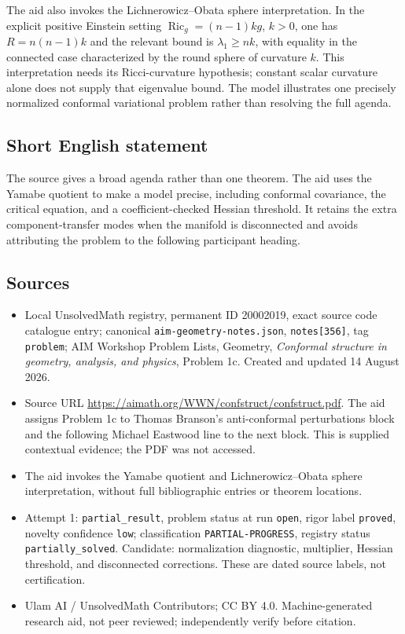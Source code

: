 \documentclass[11pt]{article}
\begin{document}
The aid also invokes the Lichnerowicz--Obata sphere interpretation. In the explicit positive Einstein setting \(\operatorname{Ric}_g=(n-1)kg\), \(k>0\), one has \(R=n(n-1)k\) and the relevant bound is \(\lambda_1\ge nk\), with equality in the connected case characterized by the round sphere of curvature \(k\). This interpretation needs its Ricci-curvature hypothesis; constant scalar curvature alone does not supply that eigenvalue bound. The model illustrates one precisely normalized conformal variational problem rather than resolving the full agenda.
\subsection{Short English statement}
The source gives a broad agenda rather than one theorem. The aid uses the Yamabe quotient to make a model precise, including conformal covariance, the critical equation, and a coefficient-checked Hessian threshold. It retains the extra component-transfer modes when the manifold is disconnected and avoids attributing the problem to the following participant heading.
\subsection{Sources}
\begin{itemize}
\item Local UnsolvedMath registry, permanent ID 20002019, exact source code catalogue entry; canonical \texttt{aim-geometry-notes.json}, \texttt{notes[356]}, tag \texttt{problem}; AIM Workshop Problem Lists, Geometry, \emph{Conformal structure in geometry, analysis, and physics}, Problem 1c. Created and updated 14 August 2026.
\item Source URL \url{https://aimath.org/WWN/confstruct/confstruct.pdf}. The aid assigns Problem 1c to Thomas Branson's anti-conformal perturbations block and the following Michael Eastwood line to the next block. This is supplied contextual evidence; the PDF was not accessed.
\item The aid invokes the Yamabe quotient and Lichnerowicz--Obata sphere interpretation, without full bibliographic entries or theorem locations.
\item Attempt 1: \texttt{partial\_result}, problem status at run \texttt{open}, rigor label \texttt{proved}, novelty confidence \texttt{low}; classification \texttt{PARTIAL-PROGRESS}, registry status \texttt{partially\_solved}. Candidate: normalization diagnostic, multiplier, Hessian threshold, and disconnected corrections. These are dated source labels, not certification.
\item Ulam AI / UnsolvedMath Contributors; CC BY 4.0. Machine-generated research aid, not peer reviewed; independently verify before citation.
\end{itemize}
\end{document}
